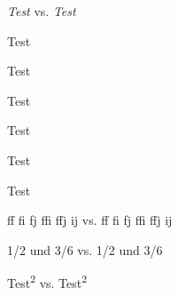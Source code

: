 \documentclass{article}
\begin{document}
   \blinddocument
   
   \textsl{Test} vs. \textit{Test}
   
   {\selectfont Test}

   {\selectfont Test}

   {\selectfont Test}   
   
   {\selectfont Test}   
   
   {\selectfont Test}   
   
   {Test }
   
   ff fi fj ffi ffj ij vs. {ff fi fj ffi ffj ij}
   
   1/2 und 3/6 vs. { 1/2 und 3/6}
   
   Test\textsuperscript{2} vs. Test\textsuperscript*{2}
\end{document}
